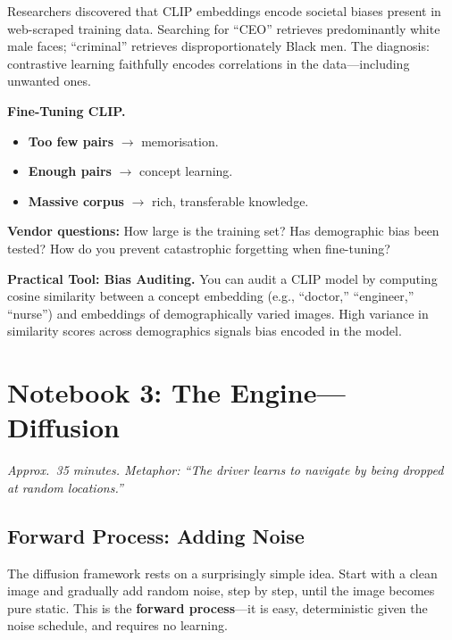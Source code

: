 \documentclass[11pt,a4paper]{article}
\begin{document}
Researchers discovered that CLIP embeddings encode societal biases present
in web-scraped training data.  Searching for ``CEO'' retrieves
predominantly white male faces; ``criminal'' retrieves disproportionately
Black men.  The diagnosis: contrastive learning faithfully encodes
correlations in the data---including unwanted ones.

\begin{managerbox}
\textbf{Fine-Tuning CLIP.}
\begin{itemize}[nosep]
  \item \textbf{Too few pairs} $\to$ memorisation.
  \item \textbf{Enough pairs} $\to$ concept learning.
  \item \textbf{Massive corpus} $\to$ rich, transferable knowledge.
\end{itemize}
\textbf{Vendor questions:} How large is the training set?  Has
demographic bias been tested?  How do you prevent catastrophic
forgetting when fine-tuning?
\end{managerbox}

\begin{managerbox}
\textbf{Practical Tool: Bias Auditing.}  You can audit a CLIP model by
computing cosine similarity between a concept embedding (e.g.,
``doctor,'' ``engineer,'' ``nurse'') and embeddings of demographically
varied images.  High variance in similarity scores across demographics
signals bias encoded in the model.
\end{managerbox}


\section{Notebook 3: The Engine---Diffusion}
\label{sec:nb3}

\textit{Approx.\ 35 minutes.  Metaphor: ``The driver learns to navigate
by being dropped at random locations.''}

\subsection{Forward Process: Adding Noise}

The diffusion framework rests on a surprisingly simple idea.  Start with
a clean image and gradually add random noise, step by step, until the
image becomes pure static.  This is the \textbf{forward process}---it is
easy, deterministic given the noise schedule, and requires no learning.
\end{document}

